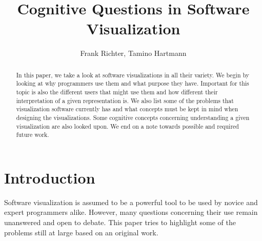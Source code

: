 \documentclass[11pt, a4paper, ngerman, twoside]{article}
\date{}
\theoremstyle{plain}\newtheorem{Lemma}{Lemma}
\theoremstyle{plain}\newtheorem{Satz}[Lemma]{Satz}
\theoremstyle{definition}\newtheorem{Definition}[Lemma]{Definition}
\theoremstyle{definition}\newtheorem*{Beispiel}{Beispiel}
\theoremstyle{remark}\newtheorem*{Bemerkung}{Bemerkung}
\begin{document}
\title{Cognitive Questions in Software Visualization}
\author{Frank Richter, Tamino Hartmann}

\makeatletter
\let\mytitle\@title
\let\myauthor\@author
\makeatother
\maketitle
\begin{abstract}

In this paper, we take a look at software visualizations in all their variety. We begin by looking at why programmers use them and what purpose they have. Important for this topic is also the different users that might use them and how different their interpretation of a given representation is. We also list some of the problems that visualization software currently has and what concepts must be kept in mind when designing the visualizations. Some cognitive concepts concerning understanding a given visualization are also looked upon. We end on a note towards possible and required future work.

\end{abstract}

\section{Introduction}

Software visualization is assumed to be a powerful tool to be used by novice and expert programmers alike. However, many questions concerning their use remain unanswered and open to debate. This paper tries to highlight some of the problems still at large based on an original work\cite{origin}.
\end{document}
